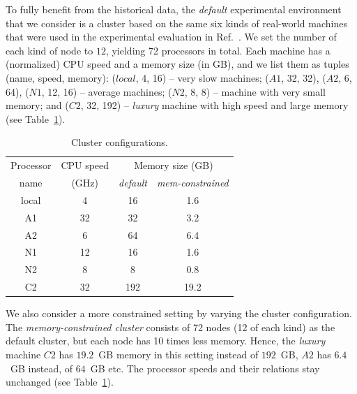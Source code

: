 \documentclass[conference]{IEEEtran}
\begin{document}
To fully benefit from the historical data, the  {\em default} experimental environment
that we consider is a cluster based on the same six
kinds of real-world machines that were used in the experimental evaluation in Ref.~\cite{lotaru}.
We set the number of each kind of node to $12$, yielding 72 processors in total.  %
%
Each machine has a (normalized) CPU speed and a memory size (in GB), and we list them as tuples (name, speed, memory):
($local$, 4, 16) -- very slow machines; ($A1$, 32, 32), ($A2$, 6, 64), ($N1$, 12, 16) -- average machines;
($N2$, 8, 8) -- machine with very small memory; and ($C2$, 32, 192) -- {\em luxury} machine with high speed and
large memory (see Table~\ref{tab:procs}).

\begin{table}[tb]
    \begin{center}
        \begin{tabular}{c|c|cc}
            \toprule
            Processor  %
            &  CPU speed   & \multicolumn{2}{c}{Memory size (GB)} \\
            name & (GHz) & {\em default} & {\em mem-constrained} \\
            \midrule
            local                    & 4                    & 16     & 1.6 \\
            A1                      & 32                   & 32     & 3.2 \\
            A2                      & 6                    & 64    & 6.4 \\
            N1                      & 12                   & 16     & 1.6 \\
            N2                      & 8                    & 8      & 0.8\\
            C2                      & 32                   & 192   &  19.2\\
            \bottomrule
        \end{tabular}
    \end{center}
    \caption{Cluster configurations.}
    \label{tab:procs}
\end{table}

We also consider a more constrained setting by varying the cluster configuration. 
The {\em memory-constrained cluster} consists of 72 nodes (12 of each kind) as the default cluster,
but each node has 10 times less memory. Hence,  
the {\em luxury} machine $C2$ has $19.2$~GB memory in this setting instead of $192$~GB, 
$A2$ has $6.4$~GB instead, of $64$~GB etc.
The processor speeds and their relations stay unchanged (see Table~\ref{tab:procs}).
\end{document}

